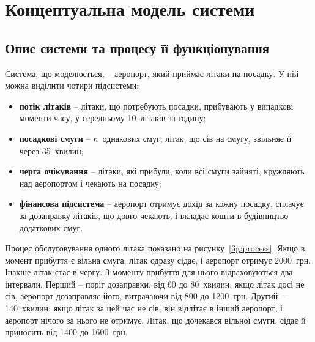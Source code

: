 \section{Концептуальна модель системи}

\subsection{Опис системи та процесу її функціонування}

Система, що моделюється, -- аеропорт, який приймає літаки на посадку. У ній можна виділити чотири підсистеми:
\begin{itemize}
\item \textbf{потік літаків} -- літаки, що потребують посадки, прибувають у випадкові моменти часу, у середньому 10~літаків за годину;
\item \textbf{посадкові смуги} -- $n$~однакових смуг; літак, що сів на смугу, звільняє її через 35~хвилин;
\item \textbf{черга очікування} -- літаки, які прибули, коли всі смуги зайняті, кружляють над аеропортом і чекають на посадку;
\item \textbf{фінансова підсистема} -- аеропорт отримує дохід за кожну посадку, сплачує за дозаправку літаків, що довго чекають, і вкладає кошти в будівництво додаткових смуг.
\end{itemize}

Процес обслуговування одного літака показано на рисунку~\ref{fig:process}. Якщо в момент прибуття є вільна смуга, літак одразу сідає, і аеропорт отримує 2000~грн. Інакше літак стає в чергу. З моменту прибуття для нього відраховуються два інтервали. Перший -- поріг дозаправки, від 60 до 80~хвилин: якщо літак досі не сів, аеропорт дозаправляє його, витрачаючи від 800 до 1200~грн. Другий -- 140~хвилин: якщо літак за цей час не сів, він відлітає в інший аеропорт, і аеропорт нічого за нього не отримує. Літак, що дочекався вільної смуги, сідає й приносить від 1400 до 1600~грн.

